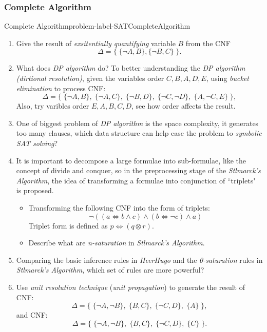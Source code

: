 \documentclass[main.tex]{subfiles}
\begin{document}
\subsubsection{Complete Algorithm}
\begin{problem}{Complete Algorithm}{problem-label-SATCompleteAlgorithm}
\begin{enumerate}[(1)]
    \item Give the result of \textit{exsitentially quantifying} variable $B$ from the CNF 
    \[
    \Delta=\{\;\{\neg A,B\},\{\neg B,C\}\;\}.
    \]
    \item What does \textit{DP algorithm} do? To better understanding the \textit{DP algorithm (dirtional resolution)}, given the variables order $C, B, A, D, E$, using \textit{bucket elimination} to process CNF:
    \[
    \Delta=\{\;\{\neg A,B\},\;\{\neg A,C\},\;\{\neg B,D\},\;\{\neg C,\neg D\},\;\{A,\neg C,E\}\;\},
    \]
    Also, try varibles order $E, A, B, C, D$, see how order affects the result.
    \item One of biggest problem of \textit{DP algorithm} is the space complexity, it generates too many clauses, which data structure can help ease the problem to \textit{symbolic SAT solving}?
    \item It is important to decompose a large formulae into sub-formulae, like the concept of divide and conquer, so in the preprocessing stage of the \textit{St\text{\aa}lmarck's Algorithm}, 
    the idea of transforming a formulae into conjunction of ``triplets" is proposed.
    \begin{itemize} 
        \item Transforming the following CNF into the form of triplets:
    \[
        \neg(({{a}}\Leftrightarrow b\wedge c)\wedge(b\Leftrightarrow\neg c)\wedge a)
    \]
    Triplet form is defined as $p\Leftrightarrow(q\otimes r)$.
    \item Describe what are \textit{n-saturation} in \textit{St\text{\aa}lmarck's Algorithm}.
    \end{itemize}
    \item Comparing the basic inference rules in \textit{HeerHugo} and the \textit{0-saturation} rules in \textit{St\text{\aa}lmarck's Algorithm}, which set of rules are more powerful?
    \item Use \textit{unit resolution technique} (\textit{unit propagation}) to generate the result of CNF:
    \[
        \Delta=\{\;\{\neg A,\neg B\},\;\{B,C\},\;\{\neg C,D\},\;\{A\}\;\},
    \]
    and CNF:
    \[
        \Delta=\{\;\{\neg A,\neg B\},\;\{B,C\},\;\{\neg C,D\},\;\{C\}\;\}.
\]
\end{enumerate}
\end{problem}
\end{document}
